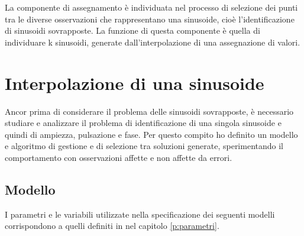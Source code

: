 \documentclass[a4paper,12pt]{report}
\begin{document}
La componente di assegnamento è individuata nel processo di selezione dei punti tra le diverse osservazioni che rappresentano una sinusoide, cioè l'identificazione di sinusoidi sovrapposte.
La funzione di questa componente è quella di individuare k sinusoidi, generate dall'interpolazione di una assegnazione di valori.



%
%





%
%
\chapter{Interpolazione di una sinusoide}
Ancor prima di considerare il problema delle sinusoidi sovrapposte, è necessario studiare e analizzare il problema di identificazione di una singola sinusoide e quindi di ampiezza, pulsazione e fase. Per questo compito ho definito un modello e algoritmo di gestione e di selezione tra soluzioni generate, sperimentando il comportamento con osservazioni affette e non affette da errori.

\section{Modello}
I parametri e le variabili utilizzate nella specificazione dei seguenti modelli corrispondono a quelli definiti in nel capitolo \ref{p:parametri}.
\end{document}
